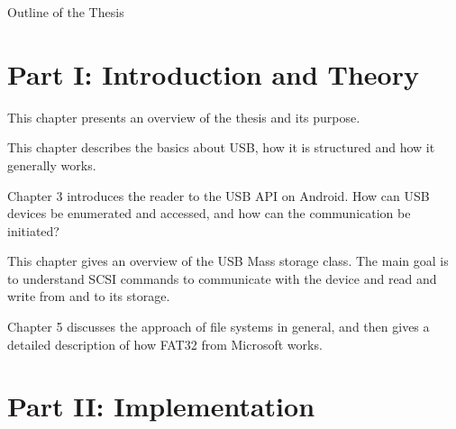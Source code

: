 \clearemptydoublepage

{}

\begin{center}
	\huge{Outline of the Thesis}
\end{center}




\section*{Part I: Introduction and Theory}

  \vspace{1mm}

\noindent  This chapter presents an overview of the thesis and its purpose. \\

  \vspace{1mm}

\noindent  This chapter describes the basics about USB, how it is structured and how it generally works.   \\

  \vspace{1mm}

\noindent  Chapter 3 introduces the reader to the USB API on Android. How can USB devices be enumerated and accessed, and how can the communication be initiated? \\

  \vspace{1mm}

\noindent  This chapter gives an overview of the USB Mass storage class. The main goal is to understand SCSI commands to communicate with the device and read and write from and to its storage. \\

  \vspace{1mm}

\noindent  Chapter 5 discusses the approach of file systems in general, and then gives a detailed description of how FAT32 from Microsoft works. \\

\section*{Part II: Implementation}

